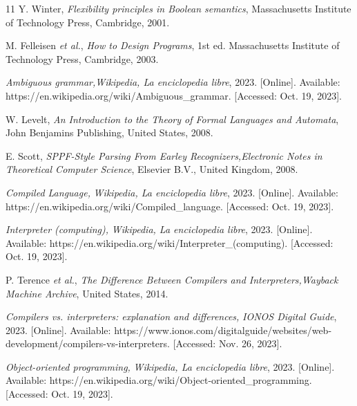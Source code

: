 \begin{thebibliography}{11}
    \label{sec:38}
    \hypertarget{38}{}
    Y. Winter, \textit{Flexibility principles in Boolean semantics}, Massachusetts Institute of Technology Press, Cambridge, 2001.

    \label{sec:39}
    \hypertarget{39}{}
    M. Felleisen \textit{et al.}, \textit{How to Design Programs}, 1st ed. Massachusetts Institute of Technology Press, Cambridge, 2003.

    \label{sec:40}
    \hypertarget{40}{}
    \textit{Ambiguous grammar,}\textit{Wikipedia, La enciclopedia libre}, 2023. [Online]. Available: https://en.wikipedia.org/wiki/Ambiguous\_grammar. [Accessed: Oct. 19, 2023].

    \label{sec:41}
    \hypertarget{41}{}
    W. Levelt, \textit{An Introduction to the Theory of Formal Languages and Automata}, John Benjamins Publishing, United States, 2008.

    \label{sec:42}
    \hypertarget{42}{}
    E. Scott, \textit{SPPF-Style Parsing From Earley Recognizers,}\textit{Electronic Notes in Theoretical Computer Science}, Elsevier B.V., United Kingdom, 2008.

    \label{sec:43}
    \hypertarget{43}{}
    \textit{Compiled Language, }\textit{Wikipedia, La enciclopedia libre}, 2023. [Online]. Available: https://en.wikipedia.org/wiki/Compiled\_language. [Accessed: Oct. 19, 2023].

    \label{sec:44}
    \hypertarget{44}{}
    \textit{Interpreter (computing), }\textit{Wikipedia, La enciclopedia libre}, 2023. [Online]. Available: https://en.wikipedia.org/wiki/Interpreter\_(computing). [Accessed: Oct. 19, 2023].

    \label{sec:45}
    \hypertarget{45}{}
    P. Terence \textit{et al.}, \textit{The Difference Between Compilers and Interpreters,}\textit{Wayback Machine Archive}, United States, 2014.

    \label{sec:46}
    \hypertarget{46}{}
    \textit{Compilers vs. interpreters: explanation and differences, }\textit{IONOS Digital Guide}, 2023. [Online]. Available: https://www.ionos.com/digitalguide/websites/web-development/compilers-vs-interpreters. [Accessed: Nov. 26, 2023].

    \label{sec:47}
    \hypertarget{47}{}
    \textit{Object-oriented programming, }\textit{Wikipedia, La enciclopedia libre}, 2023. [Online]. Available: https://en.wikipedia.org/wiki/Object-oriented\_programming. [Accessed: Oct. 19, 2023].


\end{thebibliography}
